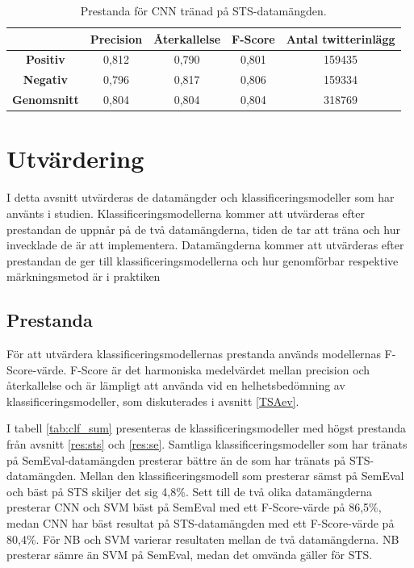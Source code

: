 \documentclass{kaumasters} %
\begin{document}
\begin{table}[H]
\centering
\caption{Prestanda för CNN tränad på STS-datamängden.}
\label{tab:cnn_sts}
    \begin{tabular}{ccccc}
    \toprule
     & \textbf{Precision} & \textbf{Återkallelse} & \textbf{F-Score} & \textbf{Antal twitterinlägg}  \\
    \midrule
    \textbf{Positiv} & 0,812 & 0,790 & 0,801 & 159435 \\
    \textbf{Negativ} & 0,796 & 0,817 & 0,806 & 159334 \\
    \midrule
    \textbf{Genomsnitt} & 0,804 & 0,804 & 0,804  & 318769 \\
    \bottomrule
\end{tabular}
\end{table}

\section{Utvärdering}\label{res:utv}
I detta avsnitt utvärderas de datamängder och klassificeringsmodeller som har använts i studien. Klassificeringsmodellerna kommer att utvärderas efter prestandan de uppnår på de två datamängderna, tiden de tar att träna och hur invecklade de är att implementera. Datamängderna kommer att utvärderas efter prestandan de ger till klassificeringsmodellerna och hur genomförbar respektive märkningsmetod är i praktiken

\subsection{Prestanda}\label{res:pres}
För att utvärdera klassificeringsmodellernas prestanda används modellernas F-Score-värde. F-Score är det harmoniska medelvärdet mellan precision och återkallelse och är lämpligt att använda vid en helhetsbedömning av klassificeringsmodeller, som diskuterades i avsnitt \ref{TSAev}. 

I tabell \ref{tab:clf_sum} presenteras de klassificeringsmodeller med högst prestanda från avsnitt \ref{res:sts} och \ref{res:se}. Samtliga klassificeringsmodeller som har tränats på SemEval-datamängden presterar bättre än de som har tränats på STS-datamängden. Mellan den klassificeringsmodell som presterar sämst på SemEval och bäst på STS skiljer det sig 4,8\%. Sett till de två olika datamängderna presterar CNN och SVM bäst på SemEval med ett F-Score-värde på 86,5\%, medan CNN har bäst resultat på STS-datamängden med ett F-Score-värde på 80,4\%. För NB och SVM varierar resultaten mellan de två datamängderna. NB presterar sämre än SVM på SemEval, medan det omvända gäller för STS.
\end{document}
